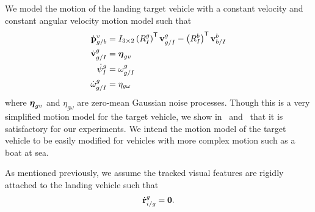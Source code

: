 We model the motion of the landing target vehicle
with a constant velocity and constant
angular velocity motion model such that
\begin{align}
  \dot{\boldsymbol{\mathrm{p}}}_{g/b}^{v} &= I_{3 \times 2} \left( R_{I}^{g} \right)^{\mathsf{T}}
   \boldsymbol{\mathrm{v}}_{g/I}^{g} - \left( R_{I}^{b} \right)^{\mathsf{T}}
  \boldsymbol{\mathrm{v}}_{b/I}^{b} \label{eq:goal_dynamics} \\
  \dot{\boldsymbol{\mathrm{v}}}_{g/I}^{g} &= \boldsymbol{\mathrm{\eta}}_{gv} \nonumber \\
  \dot{\psi}_{I}^{g} &= \omega_{g/I}^g \nonumber \\
  \dot{\omega}_{g/I}^{g} &= \eta_{g\omega} \nonumber
\end{align}
where $\boldsymbol{\mathrm{\eta}}_{gv}$ and $\eta_{g\omega}$ are zero-mean Gaussian noise
processes. Though this is a very simplified motion model for the target
vehicle, we show in~
and~ that it is
satisfactory for our experiments. We intend the motion model of the target
vehicle to be easily modified for vehicles with more complex motion such
as a boat at sea.

As mentioned previously, we assume the tracked visual features are rigidly
attached to the landing vehicle such that
\begin{equation}
  \dot{\boldsymbol{\mathrm{r}}}_{i/g}^g = \boldsymbol{\mathrm{0}}. \label{eq:feature_dynamics}
\end{equation}

